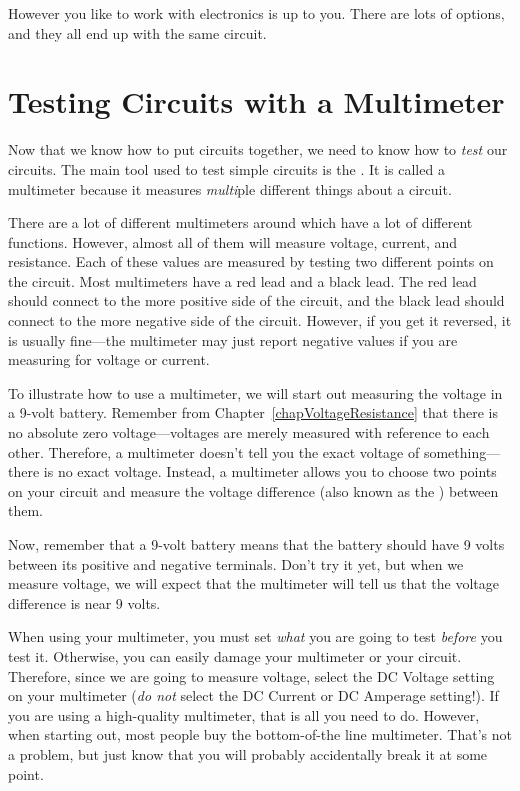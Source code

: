 However you like to work with electronics is up to you. 
There are lots of options, and they all end up with the same circuit.

\section{Testing Circuits with a Multimeter}

Now that we know how to put circuits together, we need to know how to \emph{test} our circuits.
The main tool used to test simple circuits is the .
It is called a multimeter because it measures \emph{multi}ple different things about a circuit.

There are a lot of different multimeters around which have a lot of different functions.
However, almost all of them will measure voltage, current, and resistance.
Each of these values are measured by testing two different points on the circuit.
Most multimeters have a red lead and a black lead.
The red lead should connect to the more positive side of the circuit, and the black lead should connect to the more negative side of the circuit.
However, if you get it reversed, it is usually fine---the multimeter may just report negative values if you are measuring for voltage or current.

To illustrate how to use a multimeter, we will start out measuring the voltage in a 9-volt battery.
Remember from Chapter~\ref{chapVoltageResistance} that there is no absolute zero voltage---voltages are merely measured with reference to each other.
Therefore, a multimeter doesn't tell you the exact voltage of something---there is no exact voltage.
Instead, a multimeter allows you to choose two points on your circuit and measure the voltage difference (also known as the ) between them.

Now, remember that a 9-volt battery means that the battery should have 9 volts between its positive and negative terminals.
Don't try it yet, but when we measure voltage, we will expect that the multimeter will tell us that the voltage difference is near 9 volts.

When using your multimeter, you must set \emph{what} you are going to test \emph{before} you test it.
Otherwise, you can easily damage your multimeter or your circuit.
Therefore, since we are going to measure voltage, select the DC Voltage setting on your multimeter (\emph{do not} select the DC Current or DC Amperage setting!).
If you are using a high-quality  multimeter, that is all you need to do.
However, when starting out, most people buy the bottom-of-the line multimeter.
That's not a problem, but just know that you will probably accidentally break it at some point.

